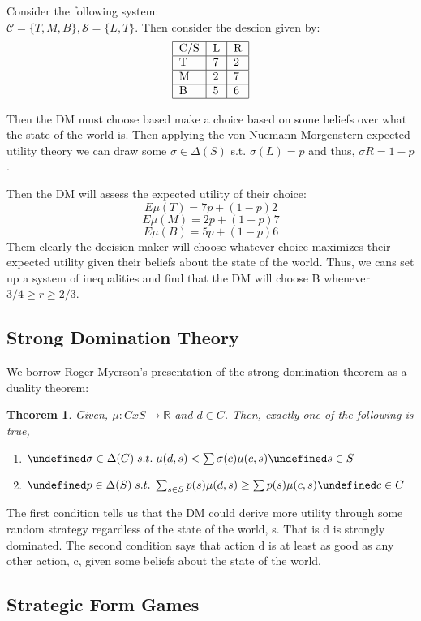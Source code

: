 \documentclass[dvips,11pt]{article}
\newcommand{\R}{\mathbb{R}}
\let\oldforall\forall
\let\forall\undefined
\DeclareMathOperator{\forall}{\,\oldforall\,}
\let\oldexists\exists
\let\exists\undefined
\DeclareMathOperator{\exists}{\,\oldexists\,}
\DeclareMathOperator{\?}{\,?\,}
\newtheorem{theorem}{Theorem}[section]
\begin{document}
Consider the following system: 
\\$\mathcal{C} = \{T,M,B\}, \mathcal{S} = \{L,T\}$. Then consider the descion given by:
$$\begin{tabular}{|l|l|l|}
\hline
 C/S & L & R \\
 \hline
T & 7 & 2 \\
\hline
M & 2 & 7 \\
\hline
B & 5 & 6 \\
\hline
\end{tabular}
$$

Then the DM must choose based make a choice based on some beliefs over what the state of the world is. Then applying the von Nuemann-Morgenstern expected utility theory we can draw some $\sigma \in \Delta(S)$ s.t. $\sigma(L) = p$ and thus, $\sigma{R} = 1-p$.

Then the DM will assess the expected utility of their choice:
$$E\mu(T) = 7p+(1-p)2$$
$$E\mu(M) = 2p+(1-p)7$$
$$E\mu(B) = 5p+(1-p)6$$
Them clearly the decision maker will choose whatever choice maximizes their expected utility given their beliefs about the state of the world. Thus, we cans set up a system of inequalities and find that the DM will choose B whenever $3/4 \geq r \geq 2/3$.

\subsection{Strong Domination Theory}
We borrow Roger Myerson's presentation of the strong domination theorem as a duality theorem:
\begin{theorem}
Given, $\mu: CxS\rightarrow\R$ and $d\in C$. Then, exactly one of the following is true,
\begin{enumerate}
\item $\exists \sigma \in \Delta(C) \; s.t.\; \mu(d,s) < \sum\sigma(c)\mu(c,s) \forall s \in S$
\item $\exists p \in \Delta(S) \; s.t. \; \sum_{s\in S}p(s)\mu(d,s) \geq \sum p(s)\mu(c,s) \forall c \in C$
\end{enumerate}
\end{theorem}

The first condition tells us that the DM could derive more utility through some random strategy regardless of the state of the world, s. That is d is strongly dominated. The second condition says that action d is at least as good as any other action, c, given some beliefs about the state of the world.

\subsection{Strategic Form Games}
\end{document}
